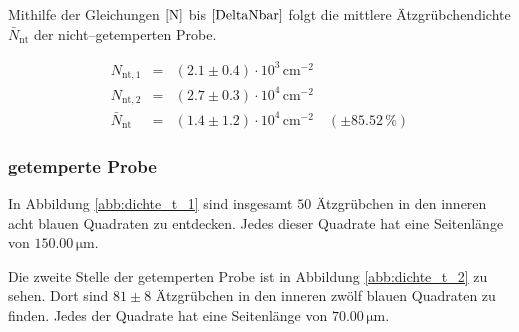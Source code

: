 \documentclass[12pt,a4paper]{scrartcl}
\numberwithin{equation}{section} %
\begin{document}
Mithilfe der Gleichungen $\eqref{N}$ bis $\eqref{DeltaNbar}$ folgt die mittlere Ätzgrübchendichte $\bar N_\mathrm{nt}$ der nicht--getemperten Probe.

\begin{eqnarray}
    N_\mathrm{nt,1} &=& (2.1 \pm 0.4) \cdot 10^3 \mathrm{\, cm^{-2}} \\
    N_\mathrm{nt,2} &=& (2.7 \pm 0.3) \cdot 10^{4} \mathrm{\, cm^{-2}} \\
    \bar N_\mathrm{nt}
        &=& (1.4 \pm 1.2) \cdot 10^4 \mathrm{\, cm^{-2}}
        \quad(\pm 85.52\,\%)
\end{eqnarray}

\hypertarget{getemperte-probe}{%
\subsubsection{getemperte Probe}\label{getemperte-probe}}

In Abbildung \ref{abb:dichte_t_1} sind insgesamt $50$ Ätzgrübchen in den inneren acht blauen Quadraten zu entdecken. Jedes dieser Quadrate hat eine Seitenlänge von $150.00 \mathrm{\, \mu m}$.

Die zweite Stelle der getemperten Probe ist in Abbildung \ref{abb:dichte_t_2} zu sehen. Dort sind $81\pm8$ Ätzgrübchen in den inneren zwölf blauen Quadraten zu finden. Jedes der Quadrate hat eine Seitenlänge von $70.00 \mathrm{\, \mu m}$.
\end{document}
